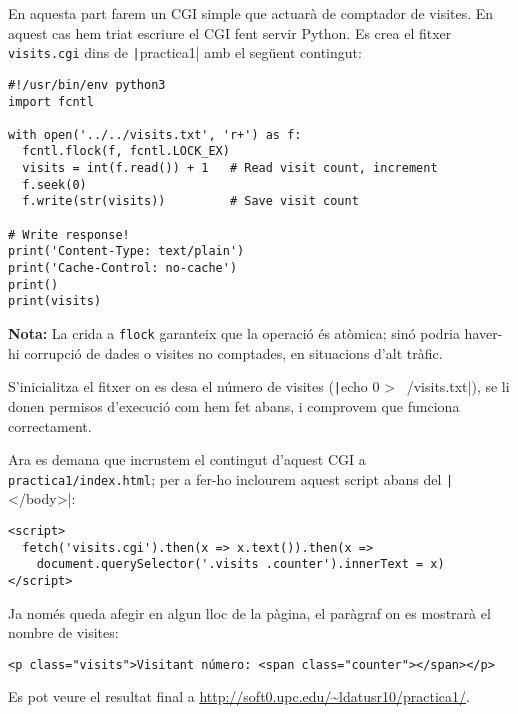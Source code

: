 \documentclass[catalan, a4paper]{scrartcl}
\begin{document}
En aquesta part farem un CGI simple que actuarà de comptador de
visites. En aquest cas hem triat escriure el CGI fent servir Python.
Es crea el fitxer \texttt{visits.cgi} dins de \texttt|practica1|
amb el següent contingut:

\begin{verbatim}
#!/usr/bin/env python3
import fcntl

with open('../../visits.txt', 'r+') as f:
  fcntl.flock(f, fcntl.LOCK_EX)
  visits = int(f.read()) + 1   # Read visit count, increment
  f.seek(0)
  f.write(str(visits))         # Save visit count

# Write response!
print('Content-Type: text/plain')
print('Cache-Control: no-cache')
print()
print(visits)
\end{verbatim}

\textbf{Nota:} La crida a \texttt{flock} garanteix que la
operació és atòmica; sinó podria haver-hi corrupció de dades
o visites no comptades, en situacions d'alt tràfic.

S'inicialitza el fitxer on es desa el número de visites (\texttt|echo 0 > ~/visits.txt|),
se li donen permisos d'execució com hem fet abans, i comprovem que funciona
correctament.

Ara es demana que incrustem el contingut d'aquest CGI a \texttt{practica1/index.html};
per a fer-ho inclourem aquest script abans del \texttt|</body>|:

\begin{verbatim}
<script>
  fetch('visits.cgi').then(x => x.text()).then(x =>
    document.querySelector('.visits .counter').innerText = x)
</script>
\end{verbatim}

Ja només queda afegir en algun lloc de la pàgina, el paràgraf on
es mostrarà el nombre de visites:

\begin{verbatim}
<p class="visits">Visitant número: <span class="counter"></span></p>
\end{verbatim}

Es pot veure el resultat final a \url{http://soft0.upc.edu/~ldatusr10/practica1/}.
\end{document}
